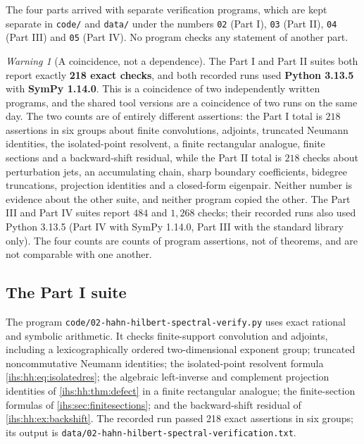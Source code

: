 \documentclass[11pt,a4paper]{article}
\numberwithin{equation}{section}
\theoremstyle{definition}
\theoremstyle{remark}
\newtheorem{warning}[warning]{Warning}
\begin{document}
The four parts arrived with separate verification programs, which are kept
separate in \texttt{code/} and \texttt{data/} under the numbers \texttt{02}
(Part I), \texttt{03} (Part II), \texttt{04} (Part III) and \texttt{05}
(Part IV). No program checks any statement of another part.

\begin{warning}[A coincidence, not a dependence]\label{ihs:warn:coincidence}
The Part I and Part II suites both report exactly \textbf{218 exact checks},
and both recorded runs used \textbf{Python 3.13.5} with \textbf{SymPy 1.14.0}.
This is a coincidence of two independently written programs, and the shared
tool versions are a coincidence of two runs on the same day. The two counts
are of entirely different assertions: the Part I total is
$218$ assertions in six groups about finite convolutions, adjoints,
truncated Neumann identities, the isolated-point resolvent, a finite
rectangular analogue, finite sections and a backward-shift residual, while
the Part II total is $218$ checks about perturbation jets, an accumulating
chain, sharp boundary coefficients, bidegree truncations, projection
identities and a closed-form eigenpair. Neither number is evidence about the
other suite, and neither program copied the other. The Part III and Part IV
suites report $484$ and $1{,}268$ checks; their recorded runs also used
Python 3.13.5 (Part IV with SymPy 1.14.0, Part III with the standard library
only). The four counts are counts of program assertions, not of theorems, and
are not comparable with one another.
\end{warning}

\subsection{The Part I suite}\label{ihs:sec:checksone}
The program \texttt{code/02-hahn-hilbert-spectral-verify.py} uses exact
rational and symbolic arithmetic. It checks finite-support convolution and
adjoints, including a lexicographically ordered two-dimensional exponent
group; truncated noncommutative Neumann identities; the isolated-point
resolvent formula \eqref{ihs:hh:eq:isolatedres}; the algebraic left-inverse
and complement projection identities of \cref{ihs:hh:thm:defect} in a finite
rectangular analogue; the finite-section formulas of
\cref{ihs:sec:finitesections}; and the backward-shift residual of
\cref{ihs:hh:ex:backshift}. The recorded run passed 218 exact assertions in
six groups; its output is
\texttt{data/02-hahn-hilbert-spectral-verification.txt}.
\end{document}
